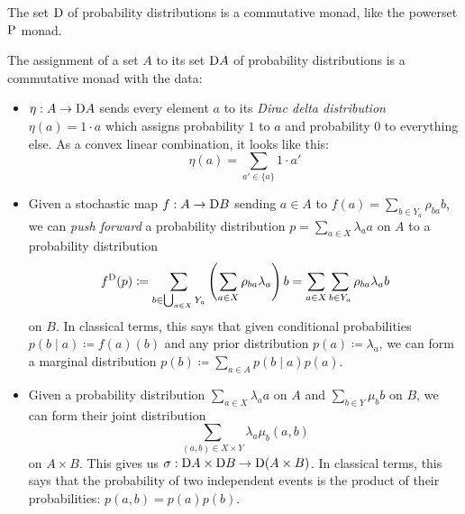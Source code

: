 \documentclass[DynamicalBook]{subfiles}
\begin{document}
The set $\mathrm{D}$ of probability distributions is a commutative monad, like the
powerset $\mathrm{P}$ monad.
\begin{proposition}\label{prop.prob_monad}
  The assignment of a set $A$ to its set $\mathrm{D} A$ of probability
  distributions is a commutative monad with the data:
  \begin{itemize}
    \item $\eta : A \to \mathrm{D} A$ sends every element $a$ to its \emph{Dirac
      delta distribution} $\eta(a) = 1 \cdot a$ which assigns probability
    $1$ to $a$ and probability $0$ to everything else. As a convex linear
    combination, it looks like this:
    \[
\eta(a) = \sum_{a' \in \{a\}} 1 \cdot a'
    \]
    \item Given a stochastic map $f : A \to \mathrm{D} B$ sending $a \in A$ to $f(a)
      = \sum_{b \in Y_a} \rho_{ba} b$, we can \emph{push
        forward} a probability distribution $p = \sum_{a \in X} \lambda_a a$ on
      $A$ to a probability distribution 
      \[
f^{\mathrm{D}}(p) \coloneqq \sum_{b \in \bigcup_{a \in X} Y_a} \left(  \sum_{a \in
    X}\rho_{ba} \lambda_a \right) b = \sum_{a \in X} \sum_{b \in Y_a} \rho_{ba}
\lambda_a b
      \]
      on $B$. In classical terms, this says that given conditional probabilities
      $p(b \mid a) \coloneqq f(a)(b)$ and any prior distribution $p(a) \coloneqq
      \lambda_a$, we can
      form a marginal distribution
      $p(b) \coloneqq \sum_{a\in A} p(b \mid a) p(a).$
   \item  Given a probability distribution $\sum_{a \in X} \lambda_a a$ on $A$
     and $\sum_{b \in Y} \mu_b b$ on $B$, we can form their joint distribution
     \[
\sum_{(a, b) \in X \times Y} \lambda_a \mu_b (a, b)
\]
on $A \times B$. This gives us $\sigma : \mathrm{D} A \times \mathrm{D} B \to
\mathrm{D} (A \times B)$. In classical terms, this says that the probability of
two independent events is the product of their probabilities: $p(a, b) = p(a)p(b)$.
  \end{itemize}
\end{proposition}
\end{document}
